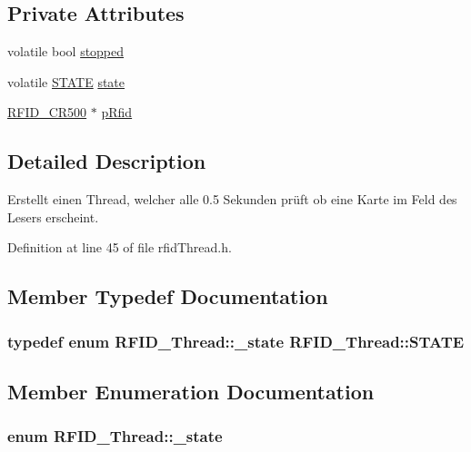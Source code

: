 \subsection*{Private Attributes}
\begin{CompactItemize}
\item 
volatile bool \hyperlink{class_r_f_i_d___thread_0ac912c1f590f586b9908beadf6c2b0f}{stopped}
\item 
volatile \hyperlink{class_r_f_i_d___thread_44a4be086bc76f772174db2b9b389eb1}{STATE} \hyperlink{class_r_f_i_d___thread_9d15987c8d3a0b8e53e936da8e50bdd6}{state}
\item 
\hyperlink{class_r_f_i_d___c_r500}{RFID\_\-CR500} $\ast$ \hyperlink{class_r_f_i_d___thread_d25fbcccbbe6d4094736f1bf1b681b7f}{pRfid}
\end{CompactItemize}


\subsection{Detailed Description}
Erstellt einen Thread, welcher alle 0.5 Sekunden prüft ob eine Karte im Feld des Lesers erscheint. 

Definition at line 45 of file rfidThread.h.

\subsection{Member Typedef Documentation}
\hypertarget{class_r_f_i_d___thread_44a4be086bc76f772174db2b9b389eb1}{
\subsubsection[STATE]{\setlength{\rightskip}{0pt plus 5cm}typedef enum {\bf RFID\_\-Thread::\_\-state}  {\bf RFID\_\-Thread::STATE}}}
\label{class_r_f_i_d___thread_44a4be086bc76f772174db2b9b389eb1}




\subsection{Member Enumeration Documentation}
\hypertarget{class_r_f_i_d___thread_0c5695c7667faf1b1efe371bbfb81a77}{
\subsubsection[\_\-state]{\setlength{\rightskip}{0pt plus 5cm}enum {\bf RFID\_\-Thread::\_\-state}}}
\label{class_r_f_i_d___thread_0c5695c7667faf1b1efe371bbfb81a77}


